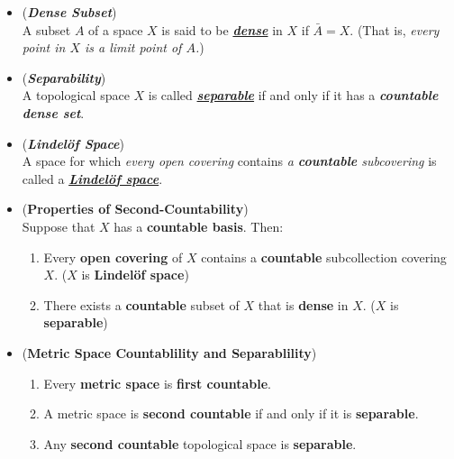 \documentclass[11pt]{article}
\begin{document}
\begin{itemize}
\item \begin{definition} (\emph{\textbf{Dense Subset}})\\
A subset $A$ of a space $X$ is said to be \underline{\emph{\textbf{dense}}} in $X$ if $\bar{A}=X$. (That is, \emph{every point in $X$ is a limit point of $A$.})
\end{definition}

\item \begin{definition} (\emph{\textbf{Separability}})\\
A topological space $X$ is called \underline{\emph{\textbf{separable}}} if and only if it has a \emph{\textbf{countable dense set}}.
\end{definition}

\item \begin{definition} (\emph{\textbf{Lindel{\"o}f Space}})\\
A space for which \emph{every open covering} contains \emph{a \textbf{countable} subcovering} is called a \underline{\emph{\textbf{Lindel{\"o}f space}}}. 
\end{definition}

\item \begin{proposition} (\textbf{Properties of Second-Countability}) \citep{munkres2000topology}\\
Suppose that $X$ has a \textbf{countable basis}. Then:
\begin{enumerate}
\item Every \textbf{open covering} of $X$ contains a \textbf{countable} subcollection covering $X$. ($X$ is \textbf{Lindel{\"o}f space})
\item There exists a \textbf{countable} subset of $X$ that is \textbf{dense} in $X$. ($X$ is \textbf{separable})
\end{enumerate}
\end{proposition}

\item \begin{proposition} (\textbf{Metric Space Countablility and Separablility})
\begin{enumerate}
\item Every \textbf{metric space} is \textbf{first countable}.
\item A metric space is \textbf{second countable} if and only if it is \textbf{separable}.
\item Any \textbf{second countable} topological space is \textbf{separable}.
\end{enumerate}
\end{proposition}
\end{itemize}
\end{document}
